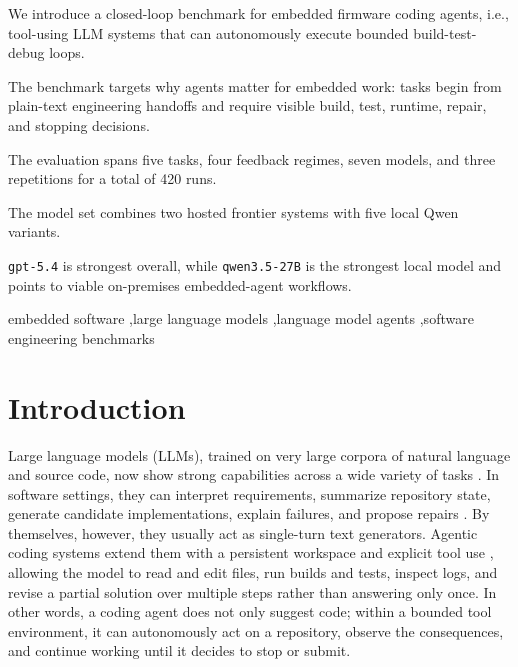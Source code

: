 \documentclass[a4paper,fleqn]{cas-dc}
\DeclareRobustCommand{\tool}[1]{\texttt{\nolinkurl{#1}}}
\begin{document}
\begin{highlights}
\item We introduce a closed-loop benchmark for embedded firmware coding agents, i.e., tool-using LLM systems that can autonomously execute bounded build-test-debug loops.
\item The benchmark targets why agents matter for embedded work: tasks begin from plain-text engineering handoffs and require visible build, test, runtime, repair, and stopping decisions.
\item The evaluation spans five tasks, four feedback regimes, seven models, and three repetitions for a total of 420 runs.
\item The model set combines two hosted frontier systems with five local Qwen variants.
\item \tool{gpt-5.4} is strongest overall, while \tool{qwen3.5-27B} is the strongest local model and points to viable on-premises embedded-agent workflows.
\end{highlights}

\begin{keywords}
embedded software \sep large language models \sep language model agents \sep software engineering benchmarks
\end{keywords}

\maketitle

\section{Introduction}
Large language models (LLMs), trained on very large corpora of natural language and source code, now show strong capabilities across a wide variety of tasks \cite{kaplan2020scaling}. In software settings, they can interpret requirements, summarize repository state, generate candidate implementations, explain failures, and propose repairs \cite{roziere2023code}. By themselves, however, they usually act as single-turn text generators. Agentic coding systems extend them with a persistent workspace and explicit tool use \cite{react}, allowing the model to read and edit files, run builds and tests, inspect logs, and revise a partial solution over multiple steps rather than answering only once. In other words, a coding agent does not only suggest code; within a bounded tool environment, it can autonomously act on a repository, observe the consequences, and continue working until it decides to stop or submit.
\end{document}
